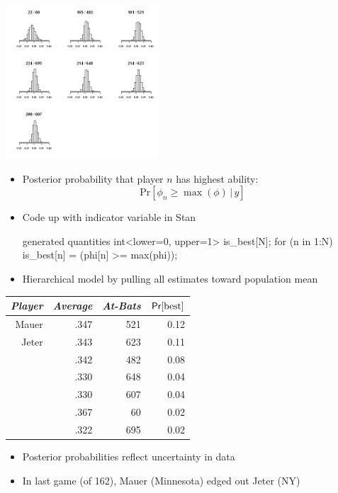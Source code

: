\documentclass[10pt]{report}
\begin{document}
%
\vspace*{-8pt}
\begin{center}
\includegraphics[height=2.25in]{img/batting-ability-posteriors.png}
\end{center}


%
\vspace*{-2pt}\small
\begin{itemize}
\item Posterior probability that player $n$ has highest ability:
\[
\mbox{Pr}[\phi_n \geq \max(\phi) \, | \, y]
\]
\item Code up with indicator variable in Stan
\begin{stancode}
generated quantities {
  int<lower=0, upper=1> is_best[N];
  for (n in 1:N)
    is_best[n] = (phi[n] >= max(phi));
}
\end{stancode}
\end{itemize}


%
\begin{itemize}
\item Hierarchical model  by pulling
  all estimates toward population mean
\end{itemize}


%
\begin{center}
{\small
\begin{tabular}{rrrr}
\emph{Player} & \emph{Average} & \emph{At-Bats} & $\text{\sf Pr}[\text{best}]$
\\ \hline
Mauer & .347 & 521 & 0.12
\\
Jeter & .343 & 623 & 0.11
\\
& .342 & 482 & 0.08
\\
& .330 & 648 & 0.04
\\
& .330 & 607 & 0.04
\\
& .367 & 60 & 0.02
\\
& .322 & 695 & 0.02
\end{tabular}
}
\end{center}
\begin{itemize}
\item Posterior probabilities reflect uncertainty in data
\item {\footnotesize In last game (of 162), Mauer (Minnesota) edged out Jeter (NY)}
\end{itemize}
\end{document}
